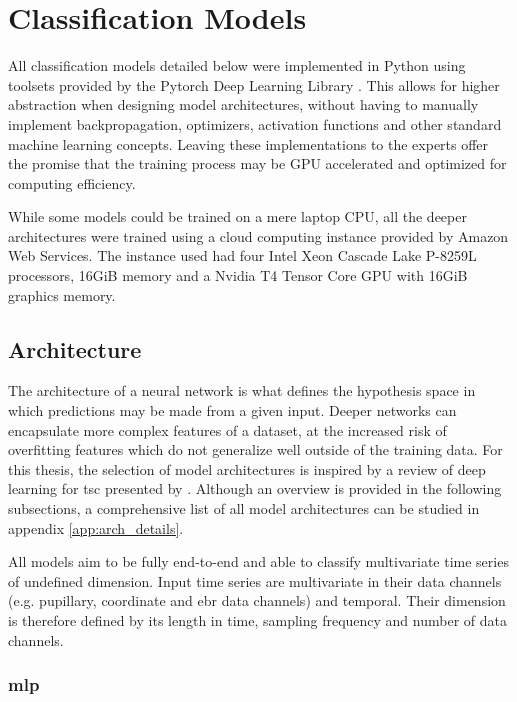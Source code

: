 \section{Classification Models} \label{sec:impl/clf_models}

All classification models detailed below were implemented in Python using toolsets provided by the Pytorch Deep Learning Library \cite{paszke2019}. This allows for higher abstraction when designing model architectures, without having to manually implement backpropagation, optimizers, activation functions and other standard machine learning concepts. Leaving these implementations to the experts offer the promise that the training process may be GPU accelerated and optimized for computing efficiency.

While some models could be trained on a mere laptop CPU, all the deeper architectures were trained using a cloud computing instance provided by Amazon Web Services. The instance used had four Intel Xeon Cascade Lake P-8259L processors, 16GiB memory and a  Nvidia T4 Tensor Core GPU with 16GiB graphics memory.

\subsection{Architecture}

The architecture of a neural network is what defines the hypothesis space in which predictions may be made from a given input. Deeper networks can encapsulate more complex features of a dataset, at the increased risk of overfitting features which do not generalize well outside of the training data. For this thesis, the selection of model architectures is inspired by a review of deep learning for \acrshort{tsc} presented by \textcite{fawaz2018}. Although an overview is provided in the following subsections, a comprehensive list of all model architectures can be studied in appendix \ref{app:arch_details}.

All models aim to be fully end-to-end and able to classify multivariate time series of undefined dimension. Input time series are multivariate in their data channels (e.g. pupillary, coordinate and \acrshort{ebr} data channels) and temporal. Their dimension is therefore defined by its length in time, sampling frequency and number of data channels. 

\subsubsection{\acrlong{mlp}}

